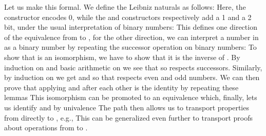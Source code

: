 Let us make this formal. We define the Leibniz naturals as follows:
Here, the  constructor encodes 0, while the  and  constructors respectively add a 1 and a 2 bit, under the usual interpretation of binary numbers:
This defines one direction of the equivalence from \bN{} to \bL{}, for the other direction, we can interpret a number in \bN{} as a binary number by repeating the successor operation on binary numbers:
To show that  is an isomorphism, we have to show that it is the inverse of . By induction on \bL{} and basic arithmetic on \bN{} we see that
so  respects successors. Similarly, by induction on \bN{} we get
and %
so that  respects even and odd numbers. We can then prove that applying  and  after each other is the identity by repeating these lemmas
This isomorphism can be promoted to an equivalence
which, finally, lets us identify \bN{} and \bL{} by univalence
The path  then allows us to transport properties from \bN{} directly to \bL{}, e.g.,
This can be generalized even further to transport proofs about operations from \bN{} to \bL{}. 

